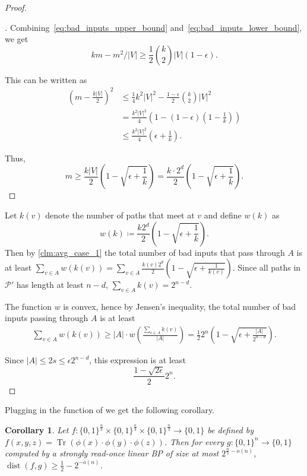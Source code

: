 \documentclass[10pt,a4paper]{article}
\newtheorem{corollary}[theorem]{Corollary}
\theoremstyle{definition}
\theoremstyle{remark}
\newenvironment{claimproof}[1][\proofname]{\begin{proof}[#1]\renewcommand*{\qedsymbol}{$\blacksquare$}}{\end{proof}}
\DeclareMathOperator{\dist}{dist}
\DeclareMathOperator{\Tr}{Tr}
\newcommand{\card}[1]{{\left|#1\right|}}
\newcommand{\Q}{{\{0,1\}}}
\newcommand{\calP}{\mathcal{P}}
\newcommand{\sreadonce}{strongly read-once}
\begin{document}
\begin{proof}
\begin{claimproof}
    Combining~\eqref{eq:bad_inputs_upper_bound} and~\eqref{eq:bad_inputs_lower_bound}, we get
    \[
      km-m^2/\card{V} \ge \frac{1}{2} \binom{k}{2} \card{V} (1-\epsilon).
    \]
  
    This can be written as
    \begin{align*}
      {\left(m-\frac{k\card{V}}{2}\right)}^2 &\le
      \frac{1}{4} k^2 \card{V}^2 - \frac{1-\epsilon}{2}\binom{k}{2}\card{V}^2 \\ &=
      \frac{k^2 \card{V}^2}{4} \left(1 - (1-\epsilon)\left(1-\frac{1}{k}\right)\right) \\ &\le
      \frac{k^2 \card{V}^2}{4} \left(\epsilon + \frac{1}{k}\right).
    \end{align*}
  
    Thus,
    \[
      m \ge \frac{k\card{V}}{2}\left(1 - \sqrt{\epsilon + \frac{1}{k}}\right) = \frac{k\cdot 2^d}{2}\left(1 - \sqrt{\epsilon + \frac{1}{k}}\right).
    \]
  \end{claimproof}

  Let $k(v)$ denote the number of paths that meet at $v$ and define $w(k)$ as
  \[
    w(k) \coloneqq \frac{k 2^d}{2}\left(1-\sqrt{\epsilon+\frac{1}{k}}\right).
  \]
  Then by \cref{clm:avg_case_1} the total number of bad inputs that pass through $A$ is at least $\sum_{v\in A} w(k(v)) = \sum_{v\in A} \frac{k(v) 2^d}{2}\left(1-\sqrt{\epsilon+\frac{1}{k(v)}}\right)$.
  Since all paths in $\calP'$ has length at least $n-d$, $\sum_{v \in A} k(v) = 2^{n-d}$.

  The function $w$ is convex, hence by Jensen's inequality, the total number of bad inputs passing through $A$ is at least
  \begin{align*}
    \sum_{v \in A} w(k(v)) \ge
    \card{A} \cdot w\left(\frac{\sum_{v \in A} k(v)}{\card{A}}\right) = \frac{1}{2} 2^n \left(1-\sqrt{\epsilon + \frac{\card{A}}{2^{n-d}}}\right).
  \end{align*}
  
  Since $\card{A} \le 2s \le \epsilon 2^{n-d}$, this expression is at least
  \[
    \frac{1-\sqrt{2\epsilon}}{2} 2^n.
  \]
\end{proof}

%

%
%
%
%
%

Plugging in the function of  we get the following corollary.

\begin{corollary}
Let $f:\Q^{\frac{n}{3}}\times \Q^{\frac{n}{3}} \times \Q^{\frac{n}{3}} \rightarrow \Q$ be defined by $f(x,y,z) = \Tr(\phi(x) \cdot \phi(y) \cdot \phi(z))$. Then for every $g:\Q^n \rightarrow \Q$ computed by a \sreadonce{} linear BP of size at most $2^{\frac{n}{3} - o(n)}$, $\dist(f, g) \ge \frac{1}{2} - 2^{-o(n)}$.
\end{corollary}
\end{document}

